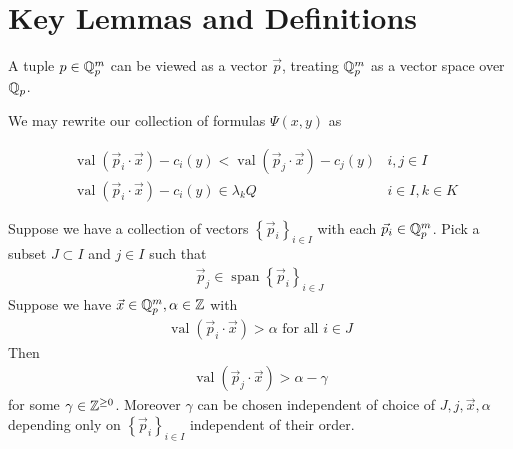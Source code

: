 \documentclass{amsart}
\newcommand{\curly}[1]{\left\{#1\right\}}
\DeclareMathOperator{\vecspan}{span}
\DeclareMathOperator{\val}{val}
\begin{document}


\section{Key Lemmas and Definitions}

\begin{Definition}
	A tuple $p \in  \mathbb{Q}_p^m$ can be viewed as a vector $\vec p$, treating $\mathbb{Q}_p^m$ as a vector space over $\mathbb{Q}_p$.
\end{Definition}

We may rewrite our collection of formulas $\Psi(x, y)$ as

\begin{align*}
	&\val (\vec p_i \cdot \vec x) - c_i(y) < \val (\vec p_j \cdot \vec x) - c_j(y) & i, j \in I \\
	&\val (\vec p_i \cdot \vec x) - c_i(y) \in \lambda_k Q & i \in I , k \in K
\end{align*}

\begin{Lemma}	 \label{gamma}
	Suppose we have a collection of vectors $\curly{\vec p_i}_{i \in I}$ with each $\vec p_i \in \mathbb{Q}_p^m$.
	Pick a subset $J \subset I$ and $j \in I$ such that
	\begin{align*}
		\vec p_j \in \vecspan \curly{\vec p_i}_{i \in J} 
	\end{align*}
	Suppose we have $\vec x \in \mathbb{Q}_p^m, \alpha \in \mathbb{Z}$ with
	\begin{align*}
		\val(\vec p_i \cdot \vec x) > \alpha \text{ for all } i \in J
	\end{align*}
	Then
	\begin{align*}
		\val(\vec p_j \cdot \vec x) > \alpha - \gamma
	\end{align*}
	for some $\gamma \in \mathbb{Z}^{\geq 0}$.
	Moreover $\gamma$ can be chosen independent of choice of $J, j, \vec x, \alpha$ depending only on $\curly{\vec p_i}_{i \in I}$ independent of their order.
\end{Lemma}
\end{document}
